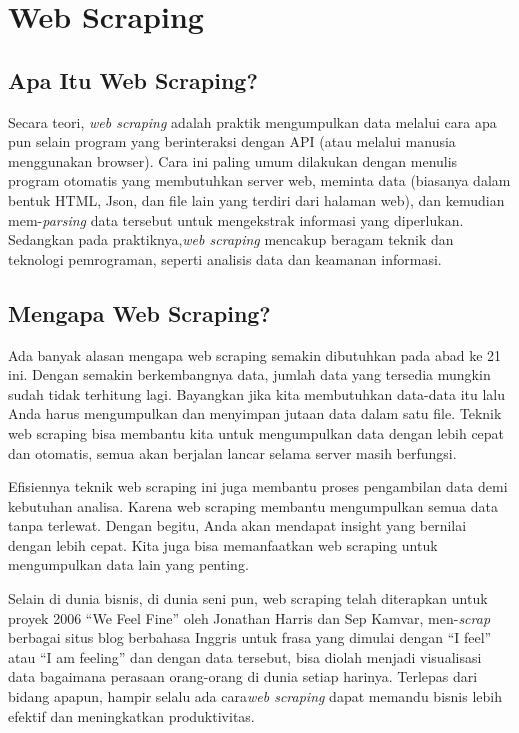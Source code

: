 \section{Web Scraping}
\subsection{Apa Itu Web Scraping?}

Secara teori, \textit{web scraping} adalah praktik mengumpulkan data melalui cara apa pun selain program yang berinteraksi dengan API (atau melalui manusia menggunakan browser). Cara ini paling umum dilakukan dengan menulis program otomatis yang membutuhkan server web, meminta data (biasanya dalam bentuk HTML, Json, dan file lain yang terdiri dari halaman web), dan kemudian mem-\textit{parsing} data tersebut untuk mengekstrak informasi yang diperlukan. Sedangkan pada praktiknya,\textit{web scraping} mencakup beragam teknik dan teknologi pemrograman, seperti analisis data dan keamanan informasi.

\subsection{Mengapa Web Scraping?}

Ada banyak alasan mengapa web scraping semakin dibutuhkan pada abad ke 21 ini. Dengan semakin berkembangnya data, jumlah data yang tersedia mungkin sudah tidak terhitung lagi. Bayangkan jika kita membutuhkan data-data itu lalu Anda harus mengumpulkan dan menyimpan jutaan data dalam satu file. Teknik web scraping bisa membantu kita untuk mengumpulkan data dengan lebih cepat dan otomatis, semua akan berjalan lancar selama server masih berfungsi.

Efisiennya teknik web scraping ini juga membantu proses pengambilan data demi kebutuhan analisa. Karena web scraping membantu mengumpulkan semua data tanpa terlewat. Dengan begitu, Anda akan mendapat insight yang bernilai dengan lebih cepat. Kita juga bisa memanfaatkan web scraping untuk mengumpulkan data lain yang penting.

Selain di dunia bisnis, di dunia seni pun, web scraping telah diterapkan untuk proyek 2006 “We Feel Fine” oleh Jonathan Harris dan Sep Kamvar, men-\textit{scrap} berbagai situs blog berbahasa Inggris untuk frasa yang dimulai dengan “I feel” atau “I am feeling” dan dengan data tersebut, bisa diolah menjadi visualisasi data bagaimana perasaan orang-orang di dunia setiap harinya. Terlepas dari bidang apapun, hampir selalu ada cara\textit{web scraping} dapat memandu bisnis lebih efektif dan meningkatkan produktivitas.

